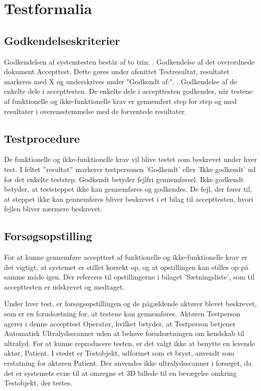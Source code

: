\chapter{Testformalia}\label{Testformlia}

\section{Godkendelseskriterier}
Godkendelsen af systemtesten består af to trin: 
. Godkendelse af det overordnede dokument Accepttest. Dette gøres under afsnittet Testresultat, resultatet markeres med X og underskrives under "Godkendt af:".
. Godkendelse af de enkelte dele i accepttesten. De enkelte dele i accepttesten godkendes, når testene af funktionelle og ikke-funktionelle krav er gennemført step for step og med resultater
i overensstemmelse med de forventede resultater.

\section{Testprocedure}
De funktionelle og ikke-funktionelle krav vil blive testet som beskrevet under hver test. I feltet ”resultat” markerer testpersonen 'Godkendt' eller 'Ikke godkendt' ud for det enkelte teststep. 
Godkendt betyder fejlfri gennemførsel. 
Ikke godkendt betyder, at teststeppet ikke kan gennemføres og godkendes. De fejl, der fører til, at steppet ikke kan gennemføres bliver beskrevet i et bilag til accepttesten, hvori fejlen bliver nærmere beskrevet. 

\section{Forsøgsopstilling}
For at kunne gennemføre accepttest af funktionelle og ikke-funktionelle krav er det vigtigt, at systemet er stillet korrekt op, og at opstillingen kan stilles op på samme måde igen. Der refereres til opstillingerne i bilaget 'Sætningsliste', som til accepttesten er udskrevet og medtaget. 

Under hver test, er forsøgsopstillingen og de pågældende aktører blevet beskrevet, som er en forudsætning for, at testene kan gennemføres. Aktøren Testperson agerer i denne accepttest Operatør, hvilket betyder, at Testperson betjener Automatisk Ultralydsscanner uden at behøve forudsætningen om kendskab til ultralyd. For at kunne reproducere testen, er det valgt ikke at benytte en levende aktør, Patient. I stedet er Testobjekt, udformet som et bryst, anvendt som erstatning for aktøren Patient. Der anvendes ikke ultralydsscanner i forsøget, da det er systemets evne til at omregne et 3D billede til en bevægelse omkring Testobjekt, der testes. 




